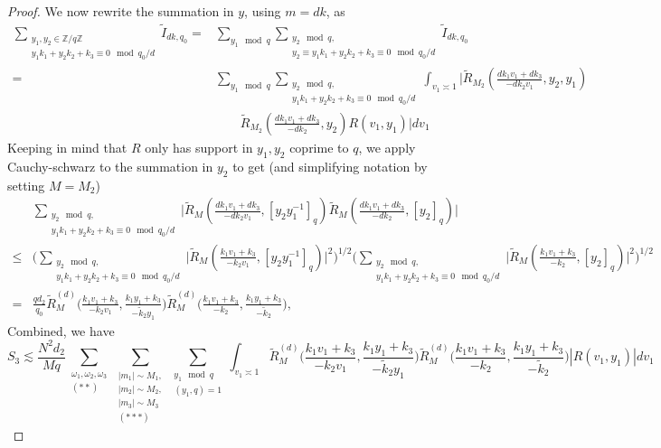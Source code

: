 \begin{proof}
    We now rewrite the summation in $y$, using $m=dk$, as \begin{align*}
        \sum_{\substack{y_1,y_2 \in\mathbb{Z}/q\mathbb{Z} \\ y_1k_1+y_2k_2+k_3\equiv 0 \mod q_0/d}}\tilde{I}_{d k ,q_0} =& \sum_{y_1\mod q} \sum_{\substack{y_2 \mod q,\\y_2\equiv y_1k_1+y_2k_2+k_3\equiv 0 \mod q_0/d}
        } \tilde{I}_{dk ,q_0}\\
        =&\sum_{y_1\mod q} \sum_{\substack{y_2 \mod q,\\ y_1k_1+y_2k_2+k_3\equiv 0 \mod q_0/d} }\int_{v_1\asymp 1} \Bigg| \tilde{R}_{M_2}\left(\frac{dk_1v_1+dk_3}{-dk_2v_1},y_2,y_1\right)\\
        & \quad \quad
        \tilde{R}_{M_2}\left(\frac{dk_1v_1+dk_3}{-dk_2},y_2\right)R\left(v_1,y_1\right)\Bigg| dv_1
    \end{align*}
    Keeping in mind that $R$ only has support in $y_1,y_2$ coprime to $q$, we apply Cauchy-schwarz to the summation in $y_2$ to get (and simplifying notation by setting $M=M_2$)\begin{align*}
        &\sum_{\substack{y_2 \mod q,\\ y_1k_1+y_2k_2+k_3\equiv 0 \mod q_0/d} } \Bigg|\tilde{R}_M\left(\frac{dk_1v_1+dk_3}{-dk_2v_1},[y_2y_1^{-1}]_{q}\right)\tilde{R}_M\left(\frac{dk_1v_1+dk_3}{-dk_2},[y_2]_q\right)\Bigg|\\
        \leq &\Bigg(\sum_{\substack{y_2 \mod q,\\ y_1k_1+y_2k_2+k_3\equiv 0 \mod q_0/d} }\Big|\tilde{R}_M\left(\frac{k_1v_1+k_3}{-k_2v_1},[y_2y_1^{-1}]_{q}\right)\Big|^2\Bigg)^{1/2}
       \Bigg( \sum_{\substack{y_2 \mod q,\\ y_1k_1+y_2k_2+k_3\equiv 0 \mod q_0/d}  }
        \Big|\tilde{R}_M\left(\frac{k_1v_1+k_3}{-k_2},[y_2]_q\right)\Big|^2 \Bigg)^{1/2}\\
        =&\frac{qd_2}{q_0}\tilde{R}_M^{(d)}\Big(\frac{k_1v_1+k_3}{-k_2v_1},\frac{k_1y_1+k_3}{-\tilde{k}_2y_1}\Big)\tilde{R}_M^{(d)}\Big(\frac{k_1v_1+k_3}{-k_2},\frac{k_1y_1+k_3}{-\tilde{k}_2}\Big),
    \end{align*} 
    Combined, we have \[
        S_3\lesssim \frac{N^2d_2}{Mq} \sum_{\substack{\omega_1,\omega_2,\omega_3\\ (**)}} \sum_{\substack{|m_1|\sim M_1,\\|m_2|\sim M_2,\\|m_3|\sim M_3\\
        (***)}}\sum_{\substack{y_1\mod q\\ (y_1,q)=1} }\int_{v_1\asymp 1}
        \tilde{R}_M^{(d)}\Big(\frac{k_1v_1+k_3}{-k_2v_1},\frac{k_1y_1+k_3}{-\tilde{k}_2y_1}\Big)\tilde{R}_M^{(d)}\Big(\frac{k_1v_1+k_3}{-k_2},\frac{k_1y_1+k_3}{-\tilde{k}_2}\Big)|R\left(v_1,y_1\right)| dv_1
    \]
\end{proof}
